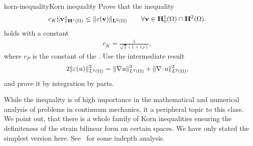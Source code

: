 \begin{Problem*}{korn-inequality}{Korn inequality}
  Prove that the inequality
  \begin{gather}
    \label{eq:mixedintro:korn}
    c_K \lVert\mathbf v\rVert_{\mathbf H^1(\Omega)}
    \le \lVert\varepsilon(\mathbf v)\rVert_{\mathbf L^2(\Omega)}
    \qquad\forall \mathbf v\in \mathbf H^1_0(\Omega) \cap \mathbf H^2(\Omega).
  \end{gather}
  holds with a constant
  \begin{gather}
    c_K = \frac1{\sqrt2(1+c_P)},
  \end{gather}
  where $c_P$ is the constant of the .
  Use the intermediate result
  \begin{gather}
    2 \lVert\varepsilon(u)\rVert^2_{L^2(\Omega)} = \lVert\nabla u\rVert_{L^2(\Omega)}^2
    + \lVert\nabla\!\cdot\! u\rVert_{L^2(\Omega)}^2,
  \end{gather}
  and prove it by integration by parts.
\end{Problem*}

While the inequality is of high importance in the mathematical and
numerical analysis of problems in continuum mechanics, it a peripheral
topic to this class. We point out, that there is a whole family of
Korn inequalities ensuring the definiteness of the strain bilinear
form on certain spaces. We have only stated the simplest version
here. See~\cite{DuvautLions76,DesvillettesVillani02} for some indepth
analysis.

